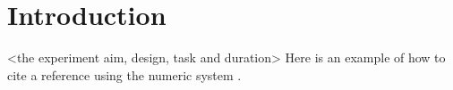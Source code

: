 \section{Introduction}

<the experiment aim, design, task and duration> 
Here is an example of how to cite a reference using the numeric system \cite{parikh1980adaptive}.

